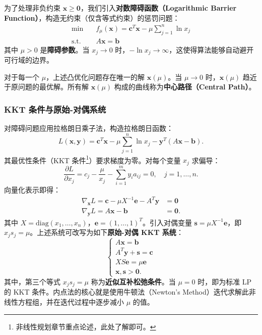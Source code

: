 \documentclass[12pt]{article}
\theoremstyle{plain}
\theoremstyle{definition}
\newcommand{\st}{\mathrel{\text{s.t.}}}
\newcommand{\diag}{\mathrm{diag}}
\begin{document}
为了处理非负约束 $\bm{x} \geq \bm{0}$，我们引入\textbf{对数障碍函数（Logarithmic Barrier Function）}，构造无约束（仅含等式约束）的惩罚问题：
\begin{align*}
    \min \quad & f_{\mu}(\bm{x}) = \bm{c}^T \bm{x} - \mu \sum_{j=1}^n \ln x_j \\
    \st \quad & A\bm{x} = \bm{b}
\end{align*}
其中 $\mu > 0$ 是\textbf{障碍参数}。当 $x_j \to 0$ 时，$-\ln x_j \to \infty$，这使得算法能够自动避开可行域的边界。

对于每一个 $\mu$，上述凸优化问题存在唯一的解 $\bm{x}(\mu)$。当 $\mu \to 0$ 时，$\bm{x}(\mu)$ 趋近于原问题的最优解。所有解 $\bm{x}(\mu)$ 构成的曲线称为\textbf{中心路径（Central Path）}。

\subsubsection{KKT 条件与原始-对偶系统}\label{subsubsec:kkt_conditions}

对障碍问题应用拉格朗日乘子法，构造拉格朗日函数：
\[ L(\bm{x}, \bm{y}) = \bm{c}^T \bm{x} - \mu \sum_{j=1}^n \ln x_j - \bm{y}^T (A\bm{x} - \bm{b}). \]
其最优性条件（KKT 条件\footnote{非线性规划章节重点论述，此处了解即可。}）要求梯度为零。对每个变量 $x_j$ 求偏导：
\[ \frac{\partial L}{\partial x_j} = c_j - \frac{\mu}{x_j} - \sum_{i=1}^m y_i a_{ij} = 0, \quad j=1,\dots,n. \]
向量化表示即得：
\begin{align*}
    \nabla_{\bm{x}} L = \bm{c} - \mu X^{-1} \bm{e} - A^T \bm{y} &= \bm{0} \\
    \nabla_{\bm{y}} L = A\bm{x} - \bm{b} &= \bm{0}.
\end{align*}
其中 $X = \diag(x_1, \dots, x_n)$，$\bm{e} = (1, \dots, 1)^T$。引入对偶变量 $\bm{s} = \mu X^{-1} \bm{e}$，即 $x_j s_j = \mu$。上述系统可改写为如下\textbf{原始-对偶 KKT 系统}：
\begin{equation} \label{eq:kkt_system}
    \begin{cases}
        A\bm{x} = \bm{b} \\
        A^T \bm{y} + \bm{s} = \bm{c} \\
        X S \bm{e} = \mu \bm{e} \\
        \bm{x}, \bm{s} > \bm{0}.
    \end{cases}
\end{equation}
其中，第三个等式 $x_j s_j = \mu$ 称为\textbf{近似互补松弛条件}。当 $\mu = 0$ 时，即为标准 LP 的 KKT 条件。内点法的核心就是使用牛顿法（Newton's Method）迭代求解此非线性方程组，并在迭代过程中逐步减小 $\mu$ 的值。
\end{document}
